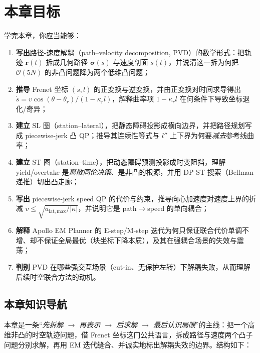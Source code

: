 \section*{本章目标}
学完本章，你应当能够：
\begin{enumerate}
  \item \textbf{写出}路径-速度解耦（path--velocity decomposition, PVD）的数学形式：把轨迹 $\mathbf{r}(t)$ 拆成几何路径 $\boldsymbol{\sigma}(s)$ 与速度剖面 $s(t)$，并说清这一拆为何把 $\mathcal{O}(5N)$ 的非凸问题降为两个低维凸问题；
  \item \textbf{推导} Frenet 坐标 $(s,l)$ 的正变换与逆变换，并由正变换对时间求导得出 $\dot s=v\cos(\theta-\theta_r)/(1-\kappa_r l)$，解释曲率项 $1-\kappa_r l$ 在何条件下导致坐标退化/奇异；
  \item \textbf{建立} SL 图（station--lateral），把静态障碍投影成横向边界，并把路径规划写成 piecewise-jerk 凸 QP；推导其连续性等式与 $l''$ 上下界为何要\emph{减去}参考线曲率；
  \item \textbf{建立} ST 图（station--time），把动态障碍预测投影成时变阻挡，理解 yield/overtake 是\emph{离散同伦决策}、是非凸的根源，并用 DP-ST 搜索（Bellman 递推）切出凸走廊；
  \item \textbf{写出} piecewise-jerk speed QP 的代价与约束，推导向心加速度对速度上界的折减 $v\le\sqrt{a_{\mathrm{lat,max}}/|\kappa|}$，并说明它是 path$\to$speed 的单向耦合；
  \item \textbf{解释} Apollo EM Planner 的 E-step/M-step 迭代为何只保证联合代价单调不增、却不保证全局最优（块坐标下降本质），及其在强耦合场景的失效与震荡；
  \item \textbf{判别} PVD 在哪些强交互场景（cut-in、无保护左转）下解耦失败，从而理解后续时空联合方法的动机。
\end{enumerate}

\subsection*{本章知识导航}
本章是一条“\emph{先拆解 $\to$ 再表示 $\to$ 后求解 $\to$ 最后认识局限}”的主线：把一个高维非凸的时空轨迹问题，借 Frenet 坐标这门公共语言，拆成路径与速度两个凸子问题分别求解，再用 EM 迭代缝合、并诚实地标出解耦失效的边界。结构如下：

